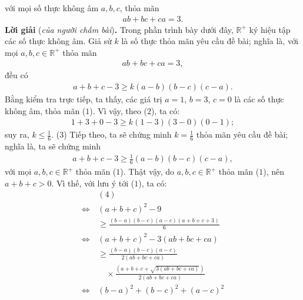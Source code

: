 \begin{multicols}{2}
	với mọi số thực không âm $a, b, c$, thỏa mãn
	\begin{align*}
		ab + bc + ca = 3.
	\end{align*}
	\textbf{\color{thachthuctoanhoc}Lời giải} (\textit{của người chấm bài})\textbf{\color{thachthuctoanhoc}.}
	\vskip 0.05cm
	Trong phần trình bày dưới đây, $\mathbb{R^+}$  ký hiệu tập các số thực không âm.
	\vskip 0.05cm
	Giả sử $k$ là số thực thỏa mãn yêu cầu đề bài; nghĩa là, với mọi $a,b,c \in \mathbb{R^+}$  thỏa mãn
	\begin{align*}
		ab + bc + ca = 3, \tag{$1$}
	\end{align*}
	đều có 
	\begin{align*}
		a \!+\! b \!+\! c \!-\! 3 \!\ge\! k\left( {a \!-\! b} \right)\left( {b \!-\! c} \right)\left( {c \!-\! a} \right). \tag{$2$}
	\end{align*}
	Bằng kiểm tra trực tiếp, ta thấy, các giá trị $a = 1$, $b = 3$, $c = 0$ là các số thực không âm, thỏa mãn ($1$). Vì vậy, theo ($2$), ta có:
	\begin{align*}
		1 + 3 + 0 - 3 \ge k\left( {1 - 3} \right)\left( {3 - 0} \right)\left( {0 - 1} \right);
	\end{align*}
	suy ra, $k \le \frac{1}{6}$. \hfill ($3$)
	\vskip 0.05cm
	Tiếp theo, ta sẽ chứng minh $k = \frac{1}{6}$  thỏa mãn yêu cầu đề bài; nghĩa là, ta sẽ chứng minh
	\begin{align*}
		a + b + c - 3 \ge \frac{1}{6}\left( {a - b} \right)\left( {b - c} \right)\left( {c - a} \right),
	\end{align*}
	với mọi $a,b,c \in \mathbb{R^+}$  thỏa mãn ($1$).
	\vskip 0.05cm
	Thật vậy, do $a,b,c \in \mathbb{R^+}$  thỏa mãn ($1$), nên $a + b + c > 0$. Vì thế, với lưu ý tới ($1$), ta có:
	\begin{align*}
		&(4) \\
		\Leftrightarrow \,&{\left( {a + b + c} \right)^2} - 9 \\
		&\ge \frac{{\left( {b - a} \right)\left( {b - c} \right)\left( {a - c} \right)\left( {a + b + c + 3} \right)}}{6}\\
		\Leftrightarrow \,&{\left( {a + b + c} \right)^2} - 3\left( {ab + bc + ca} \right) \\
		&\ge \frac{{\left( {b - a} \right)\left( {b - c} \right)\left( {a - c} \right)}}{{2\left( {ab + bc + ca} \right)}}\\
		&\quad\times \frac{\left( {a + b + c + \sqrt {3\left( {ab + bc + ca} \right)} } \right)}{{2\left( {ab + bc + ca} \right)}}\\
		\Leftrightarrow \,&{\left( {b - a} \right)^2} + {\left( {b - c} \right)^2} + {\left( {a - c} \right)^2} \\

\end{align*}
\end{multicols}
